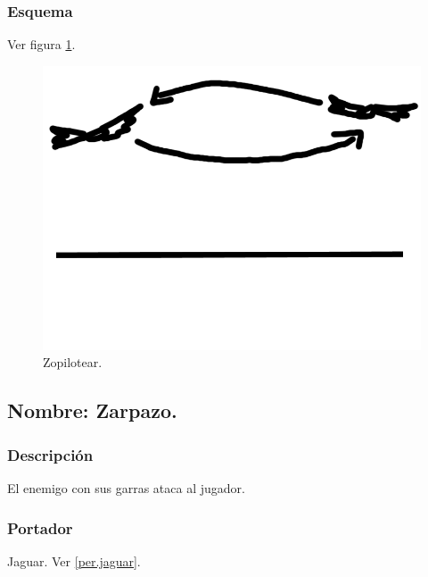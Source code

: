 \documentclass[11pt,letterpaper]{article}
\begin{document}
		\subsubsection{Esquema}
		Ver figura \ref{fig:zopilotear}.
		\begin{figure}
			\centering
			\includegraphics[height=0.2 \textheight]{Imagenes/zopilotear}
			\caption{Zopilotear.}
			\label{fig:zopilotear}
		\end{figure}
			\subsection{Nombre: Zarpazo.} \label{hab.zarpazo}
			\subsubsection{Descripción}
			El enemigo con sus garras ataca al jugador.
			\subsubsection{Portador}
			Jaguar. Ver \ref{per.jaguar}.
\end{document}
